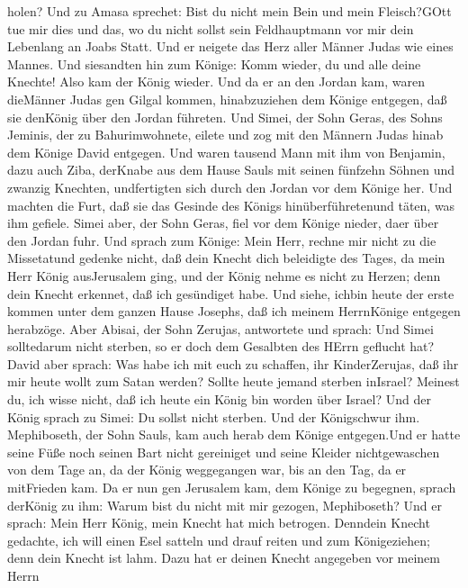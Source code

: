 holen?  Und zu Amasa sprechet: Bist du nicht mein Bein und
mein Fleisch?GOtt tue mir dies und das, wo du nicht sollst sein
Feldhauptmann vor mir dein Lebenlang an Joabs Statt.  Und
er neigete das Herz aller Männer Judas wie eines Mannes. Und siesandten
hin zum Könige: Komm wieder, du und alle deine Knechte! 
Also kam der König wieder. Und da er an den Jordan kam, waren dieMänner
Judas gen Gilgal kommen, hinabzuziehen dem Könige entgegen, daß sie
denKönig über den Jordan führeten.  Und Simei, der Sohn
Geras, des Sohns Jeminis, der zu Bahurimwohnete, eilete und zog mit den
Männern Judas hinab dem Könige David entgegen.  Und waren
tausend Mann mit ihm von Benjamin, dazu auch Ziba, derKnabe aus dem
Hause Sauls mit seinen fünfzehn Söhnen und zwanzig Knechten,
undfertigten sich durch den Jordan vor dem Könige her.  Und
machten die Furt, daß sie das Gesinde des Königs hinüberführetenund
täten, was ihm gefiele. Simei aber, der Sohn Geras, fiel vor dem Könige
nieder, daer über den Jordan fuhr.  Und sprach zum Könige:
Mein Herr, rechne mir nicht zu die Missetatund gedenke nicht, daß dein
Knecht dich beleidigte des Tages, da mein Herr König ausJerusalem ging,
und der König nehme es nicht zu Herzen;  denn dein Knecht
erkennet, daß ich gesündiget habe. Und siehe, ichbin heute der erste
kommen unter dem ganzen Hause Josephs, daß ich meinem HerrnKönige
entgegen herabzöge.  Aber Abisai, der Sohn Zerujas,
antwortete und sprach: Und Simei solltedarum nicht sterben, so er doch
dem Gesalbten des HErrn geflucht hat?  David aber sprach:
Was habe ich mit euch zu schaffen, ihr KinderZerujas, daß ihr mir heute
wollt zum Satan werden? Sollte heute jemand sterben inIsrael? Meinest
du, ich wisse nicht, daß ich heute ein König bin worden über Israel?
 Und der König sprach zu Simei: Du sollst nicht sterben.
Und der Königschwur ihm.  Mephiboseth, der Sohn Sauls, kam
auch herab dem Könige entgegen.Und er hatte seine Füße noch seinen Bart
nicht gereiniget und seine Kleider nichtgewaschen von dem Tage an, da
der König weggegangen war, bis an den Tag, da er mitFrieden kam.
 Da er nun gen Jerusalem kam, dem Könige zu begegnen,
sprach derKönig zu ihm: Warum bist du nicht mit mir gezogen,
Mephiboseth?  Und er sprach: Mein Herr König, mein Knecht
hat mich betrogen. Denndein Knecht gedachte, ich will einen Esel satteln
und drauf reiten und zum Königeziehen; denn dein Knecht ist lahm.
 Dazu hat er deinen Knecht angegeben vor meinem Herrn
